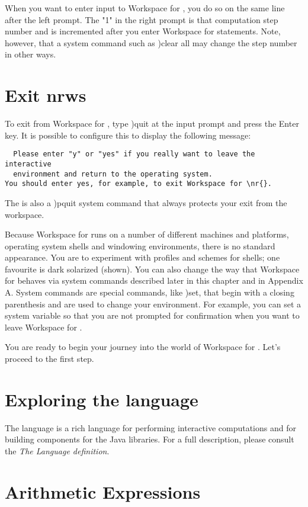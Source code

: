 
When you want to enter input to Workspace for \nr{}, you do so on the same line after the left prompt. The "1" in the right prompt is that computation step number and is incremented after you enter Workspace for \nr{} statements. Note, however, that a system command such as )clear all may change the step number in other ways.

\section{Exit nrws}
To exit from Workspace for \nr{}, type )quit at the input prompt and press the Enter key. It is possible to configure this to display the following message:
\begin{verbatim}
  Please enter "y" or "yes" if you really want to leave the interactive
  environment and return to the operating system.
You should enter yes, for example, to exit Workspace for \nr{}.
\end{verbatim}
The is also a )pquit system command that always protects your exit from the workspace.

Because Workspace for \nr{} runs on a number of different machines and platforms, operating system shells and windowing environments, there is no standard appearance. You are to experiment with profiles and schemes for shells; one favourite is dark solarized (shown). You can also change the way that Workspace for \nr{} behaves via system commands described later in this chapter and in Appendix A. System commands are special commands, like )set, that begin with a closing parenthesis and are used to change your environment. For example, you can set a system variable so that you are not prompted for confirmation when you want to leave Workspace for \nr{}.

You are ready to begin your journey into the world of Workspace for \nr{}. Let's proceed to the first step.

 \section{Exploring the \nr{} language}

The \nr{} language is a rich language for performing interactive
computations and for building components for the Java libraries. For a
full description, please consult the \emph{The \nr{} Language definition}.

 \section{Arithmetic Expressions}

